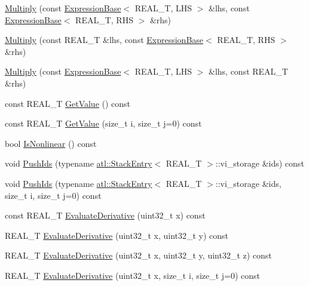 \begin{DoxyCompactItemize}
\item 
\hyperlink{structatl_1_1_multiply_a71353c701201490c6ee810658d4fb953}{Multiply} (const \hyperlink{structatl_1_1_expression_base}{Expression\+Base}$<$ R\+E\+A\+L\+\_\+\+T, L\+H\+S $>$ \&lhs, const \hyperlink{structatl_1_1_expression_base}{Expression\+Base}$<$ R\+E\+A\+L\+\_\+\+T, R\+H\+S $>$ \&rhs)
\item 
\hyperlink{structatl_1_1_multiply_ac614c1ef3b3c6bf4e46dadf8d9b0538b}{Multiply} (const R\+E\+A\+L\+\_\+\+T \&lhs, const \hyperlink{structatl_1_1_expression_base}{Expression\+Base}$<$ R\+E\+A\+L\+\_\+\+T, R\+H\+S $>$ \&rhs)
\item 
\hyperlink{structatl_1_1_multiply_a7b863518694411a59bc103be12d73cbb}{Multiply} (const \hyperlink{structatl_1_1_expression_base}{Expression\+Base}$<$ R\+E\+A\+L\+\_\+\+T, L\+H\+S $>$ \&lhs, const R\+E\+A\+L\+\_\+\+T \&rhs)
\item 
const R\+E\+A\+L\+\_\+\+T \hyperlink{structatl_1_1_multiply_a2ea701e5cef0632f5c27cb626e1f165f}{Get\+Value} () const 
\item 
const R\+E\+A\+L\+\_\+\+T \hyperlink{structatl_1_1_multiply_a5a28954726bf2016e94564e587013c7f}{Get\+Value} (size\+\_\+t i, size\+\_\+t j=0) const 
\item 
bool \hyperlink{structatl_1_1_multiply_a788bf22cc55af594eb50cc56f901ef90}{Is\+Nonlinear} () const 
\item 
void \hyperlink{structatl_1_1_multiply_ad2a09b1cf0d1dbe48b3a532cba272eeb}{Push\+Ids} (typename \hyperlink{structatl_1_1_stack_entry}{atl\+::\+Stack\+Entry}$<$ R\+E\+A\+L\+\_\+\+T $>$\+::vi\+\_\+storage \&ids) const 
\item 
void \hyperlink{structatl_1_1_multiply_a90777da934335b5320b4975fbeb332fc}{Push\+Ids} (typename \hyperlink{structatl_1_1_stack_entry}{atl\+::\+Stack\+Entry}$<$ R\+E\+A\+L\+\_\+\+T $>$\+::vi\+\_\+storage \&ids, size\+\_\+t i, size\+\_\+t j=0) const 
\item 
const R\+E\+A\+L\+\_\+\+T \hyperlink{structatl_1_1_multiply_ac9c7ec127366992b536d53162b783c0f}{Evaluate\+Derivative} (uint32\+\_\+t x) const 
\item 
R\+E\+A\+L\+\_\+\+T \hyperlink{structatl_1_1_multiply_a7d4dd40f6f10423bed06cd94dc32c230}{Evaluate\+Derivative} (uint32\+\_\+t x, uint32\+\_\+t y) const 
\item 
R\+E\+A\+L\+\_\+\+T \hyperlink{structatl_1_1_multiply_a9dbc68b47f2687a2a3e510b1e30b25e1}{Evaluate\+Derivative} (uint32\+\_\+t x, uint32\+\_\+t y, uint32\+\_\+t z) const 
\item 
R\+E\+A\+L\+\_\+\+T \hyperlink{structatl_1_1_multiply_aaf3d6bff82038810945ee401d02b840d}{Evaluate\+Derivative} (uint32\+\_\+t x, size\+\_\+t i, size\+\_\+t j=0) const 

\end{DoxyCompactItemize}
